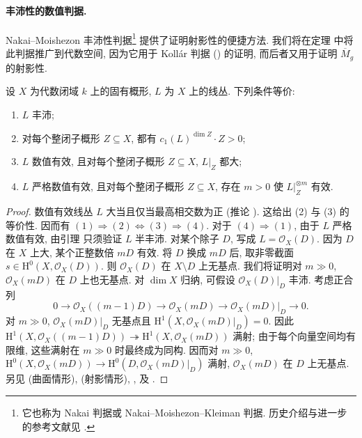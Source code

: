 \paragraph{丰沛性的数值判据.}
Nakai--Moishezon 丰沛性判据\footnote{它也称为 Nakai 判据或 Nakai--Moishezon--Kleiman 判据. 历史介绍与进一步的参考文献见 \cite[\S$1.2$.B]{Laz04a}.} 提供了证明射影性的便捷方法. 我们将在定理  中将此判据推广到代数空间, 因为它用于 Kollár 判据 () 的证明, 而后者又用于证明 $\overline M_g$ 的射影性.
\begin{theorem}\label{src:B.2.28}
设 $X$ 为代数闭域 $k$ 上的固有概形, $L$ 为 $X$ 上的线丛. 下列条件等价:
\begin{enumerate}[(1)]
\item $L$ 丰沛;
\item 对每个整闭子概形 $Z\subseteq X$, 都有 $c_1(L)^{\dim Z}\cdot Z>0$;
\item $L$ 数值有效, 且对每个整闭子概形 $Z\subseteq X$, $L|_Z$ 都大;
\item $L$ 严格数值有效, 且对每个整闭子概形 $Z\subseteq X$, 存在 $m>0$ 使 $L|_Z^{\otimes m}$ 有效.
\end{enumerate}
\end{theorem}
\begin{proof}
数值有效线丛 $L$ 大当且仅当最高相交数为正 (推论 ). 这给出 (2) 与 (3) 的等价性. 因而有 $(1)\Rightarrow(2)\Leftrightarrow(3)\Rightarrow(4)$. 对于 $(4)\Rightarrow(1)$, 由于 $L$ 严格数值有效, 由引理  只须验证 $L$ 半丰沛. 对某个除子 $D$, 写成 $L=\mathcal O_X(D)$. 因为 $D$ 在 $X$ 上大, 某个正整数倍 $mD$ 有效. 将 $D$ 换成 $mD$ 后, 取非零截面 $s\in\mathrm H^0(X,\mathcal O_X(D))$. 则 $\mathcal O_X(D)$ 在 $X\setminus D$ 上无基点. 我们将证明对 $m\gg0$, $\mathcal O_X(mD)$ 在 $D$ 上也无基点. 对 $\dim X$ 归纳, 可假设 $\mathcal O_X(D)|_D$ 丰沛. 考虑正合列
\[
0\longrightarrow\mathcal O_X((m-1)D)\longrightarrow\mathcal O_X(mD)
\longrightarrow\mathcal O_X(mD)|_D\longrightarrow0.
\]
\setlength{\emergencystretch}{4em}
对 $m\gg0$, $\mathcal O_X(mD)|_D$ 无基点且 $\mathrm H^1(X,\mathcal O_X(mD)|_D)=0$. 因此 $\mathrm H^1(X,\mathcal O_X((m-1)D))\twoheadrightarrow\mathrm H^1(X,\mathcal O_X(mD))$ 满射; 由于每个向量空间均有限维, 这些满射在 $m\gg0$ 时最终成为同构. 因而对 $m\gg0$, $\mathrm H^0(X,\mathcal O_X(mD))\to\mathrm H^0(D,\mathcal O_X(mD)|_D)$ 满射, $\mathcal O_X(mD)$ 在 $D$ 上无基点. 另见 \cite[定理 V.$1.10$]{Har77} (曲面情形), \cite[定理 $1.2.23$]{Laz04a} (射影情形), \cite[定理 VI.$2.18$]{Kol96}, \cite[定理 $1.37$]{KM98} 及 \cite[\S III.$1$]{Kle66}.
\end{proof}
